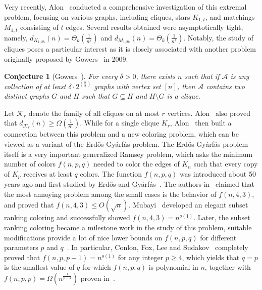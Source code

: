 \documentclass[11pt]{article}
\newtheorem{conj}{Conjecture}
\theoremstyle{definition}
\begin{document}
Very recently, Alon~\cite{2023AlonCodes} conducted a comprehensive investigation of this extremal problem, focusing on various graphs, including cliques, stars $K_{1,t}$, and matchings $M_{1,t}$ consisting of $t$ edges. Several results obtained were asymptotically tight, namely, $d_{K_{1,2k}}(n)=\Theta_{k}(\frac{1}{n^{k}})$ and $d_{M_{1,2k}}(n)=\Theta_{k}(\frac{1}{n^{k}})$. Notably, the study of cliques poses a particular interest as it is closely associated with another problem originally proposed by Gowers~\cite{2009Gowers} in 2009.

\begin{conj}[Gowers~\cite{2009Gowers}]
    For every $\delta>0$, there exists $n$ such that if $\mathcal{A}$ is any collection of at least $\delta\cdot 2^{\binom{n}{2}}$ graphs with vertex set $[n]$, then $\mathcal{A}$ contains two distinct graphs $G$ and $H$ such that $G\subseteq H$ and $H\setminus G$ is a clique.
\end{conj}

Let $\mathcal{K}_{r}$ denote the family of all cliques on at most $r$ vertices. Alon~\cite{2023AlonCodes} also proved that $d_{\mathcal{K}_{r}}(n)\geq\Omega(\frac{1}{n^{r}})$. While for a single clique $K_{r}$,
Alon~\cite{2023AlonCodes} then built a connection between this problem and a new coloring problem, which can be viewed as a variant of the Erd\H{o}s-Gy\'{a}rf\'{a}s problem.
The Erd\H{o}s-Gy\'{a}rf\'{a}s problem itself is a very important generalized Ramsey problem, which asks the minimum number of colors $f(n,p,q)$ needed to color the edges of $K_{n}$ such that every copy of $K_{p}$ receives at least $q$ colors. The function $f(n,p,q)$ was introduced about 50 years ago and first studied by Erd\H{o}s and Gy\'{a}rf\'{a}s~\cite{1997EG}. The authors in~\cite{1997EG} claimed that the most annoying problem among the small cases is the behavior of $f(n,4,3)$, and proved that $f(n,4,3)\le O(\sqrt{n})$. Mubayi~\cite{1998Mubayi43} developed an elegant subset ranking coloring and successfully showed $f(n,4,3)=n^{o(1)}$. Later, the subset ranking coloring became a milestone work in the study of this problem, suitable modifications provide a lot of nice lower bounds on $f(n,p,q)$ for different parameters $p$ and $q$~\cite{2018CPC55,2023CPC6688,2015PLMSCFLS,2000Mubayi54,2004Mubayi44}. In particular, Conlon, Fox, Lee and Sudakov~\cite{2015PLMSCFLS} completely proved that $f(n,p,p-1)=n^{o(1)}$ for any integer $p\ge 4$, which yields that $q=p$ is the smallest value of $q$ for which $f(n,p,q)$ is polynomial in $n$, together with $f(n,p,p)=\Omega(n^{\frac{1}{p-2}})$ proven in~\cite{1997EG}. 
\end{document}
